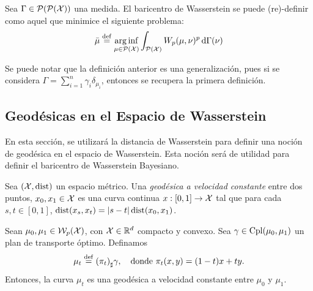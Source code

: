 {{{		  \begin{definition}
			  Sea $\Gamma \in \ProbSpace[\ProbSpace]$ una medida. El baricentro de Wasserstein se puede (re)-definir como aquel que minimice el siguiente problema:
			  \begin{equation}
				  \bar \mu \eqdef \arginf_{\mu \in \ProbSpace} \int_{\ProbSpace} \Wasserstein[p]{\mu}{\nu}^p \dd{\Gamma(\nu)}
			  \end{equation}

		  \end{definition}

		  \begin{remark}
			  Se puede notar que la definición anterior es una generalización, pues si se considera $\Gamma = \sum_{i=1}^{n} \gamma_i \delta_{\mu_i}$, entonces se recupera la primera definición.
		  \end{remark}



	  }  %


	  \subsection{Geodésicas en el Espacio de Wasserstein}\label{ssec:geodesicas-Wasserstein}
	  {
		  En esta sección, se utilizará la distancia de Wasserstein para definir una noción de geodésica en el espacio de Wasserstein. Esta noción será de utilidad para definir el baricentro de Wasserstein Bayesiano.
		  \begin{definition}
			  Sea $(\cX, \dist)$ un espacio métrico. Una \emph{geodésica a velocidad constante}  entre dos puntos, $x_0, x_1 \in \cX$ es una curva continua $x : [0, 1] \to \cX$  tal que para cada $s, t \in [0, 1]$, $\dist(x_s,x_t) = |s - t| \dist(x_0,x_1) $.
		  \end{definition}

		  \begin{proposition}
			  Sean $\mu_0, \mu_1 \in \WassersteinSpace[p]{\cX} $, con $\cX \in \R^d$  compacto y convexo. Sea $\gamma \in \Cpl(\mu_0, \mu_1)$  un plan de transporte óptimo. Definamos
			  \begin{equation}
				  \mu_t \eqdef \pf{(\pi_t)} \gamma, \quad \text{donde } \pi_t(x, y) = (1-t)x + ty.
			  \end{equation}
			  Entonces, la curva $\mu_t$ es una geodésica a velocidad constante entre $\mu_0$ y $\mu_1$.


\end{proposition}}}}
